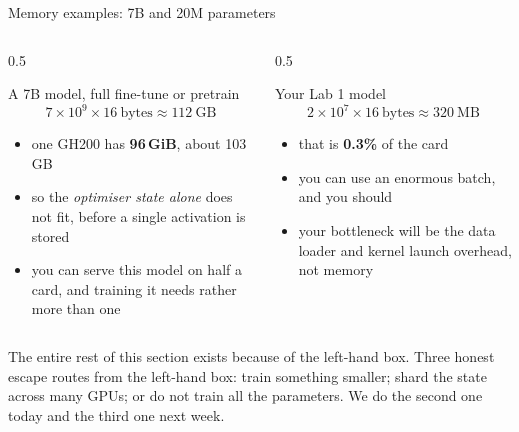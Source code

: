 \documentclass[aspectratio=169,10pt]{beamer}
\begin{document}
\begin{frame}[shrink=3]{Memory examples: 7B and 20M parameters}
  \begin{columns}[T]
    \begin{column}{0.5\textwidth}
      \begin{block}{A 7B model, full fine-tune or pretrain}
        \[ 7\times10^{9} \times 16\ \text{bytes} \approx 112\ \text{GB} \]
        \vspace{-0.6em}
        \begin{itemize}\small
          \item one GH200 has \textbf{96\,GiB}, about 103\,GB
          \item so the \emph{optimiser state alone} does not fit, before a
            single activation is stored
          \item you can serve this model on half a card, and training it needs
            rather more than one
        \end{itemize}
      \end{block}
    \end{column}
    \begin{column}{0.5\textwidth}
      \begin{block}{Your Lab 1 model}
        \[ 2\times10^{7} \times 16\ \text{bytes} \approx 320\ \text{MB} \]
        \vspace{-0.6em}
        \begin{itemize}\small
          \item that is \textbf{0.3\%} of the card
          \item you can use an enormous batch, and you should
          \item your bottleneck will be the data loader and kernel launch
            overhead, not memory
        \end{itemize}
      \end{block}
    \end{column}
  \end{columns}
  \vspace{0.6em}
  \centering
  The entire rest of this section exists because of the left-hand box.
  \vfill
  \small
  Three honest escape routes from the left-hand box: train something smaller;
  shard the state across many GPUs; or do not train all the parameters. We do
  the second one today and the third one next week.
\end{frame}
\end{document}
